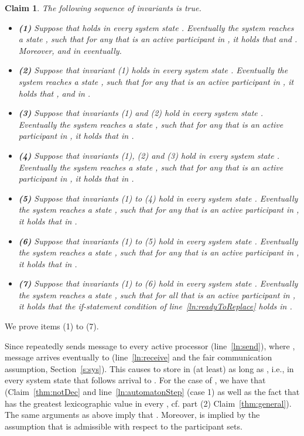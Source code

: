\documentclass[11pt]{article}
\newtheorem{claim}[theorem]{Claim}
\newenvironment{proof}{\noindent{\bf Proof.}}{\hfill}
\begin{document}
\begin{proof}
\begin{claim}
\label{thm:invar}
The following sequence of invariants is true.
\begin{itemize}[topsep=2pt,itemsep=-.5ex,partopsep=.5ex,parsep=1ex,leftmargin=2mm]
\item []{\bf (1)} Suppose that  holds in  every system state . Eventually the system reaches a state , such that for any  that is an active participant in , it holds that  and . Moreover, 
 and  in  eventually. 

\item[]{\bf (2)} Suppose that invariant (1) holds in  every system state . Eventually the system reaches a state , such that for any  that is an active participant in , it holds that ,  and   in .

\item[]{\bf (3)} Suppose that invariants (1) and (2) hold in every system state . Eventually the system reaches a state , such that for any  that is an active participant in , it holds that   in .

\item[]{\bf (4)} Suppose that invariants (1), (2) and (3) hold in every system state . Eventually the system reaches a state , such that for any  that is an active participant in , it holds that   in . 

\item[]{\bf (5)} Suppose that invariants (1) to (4) hold in every system state . Eventually the system reaches a state , such that for any  that is an active participant in , it holds that  in . 

\item[]{\bf (6)} Suppose that invariants (1) to (5) hold in every system state . Eventually the system reaches a state , such that for any  that is an active participant in , it holds that   in . 






\item[]{\bf (7)} Suppose that invariants (1) to (6) hold in every system state . Eventually the system reaches a state , such that for all  that is an active participant in , it holds that the if-statement condition of line~\ref{ln:readyToReplace} holds in .
\end{itemize}
\end{claim}
\begin{proof} We prove items (1) to (7). 
	
 Since  repeatedly sends message  to every active processor  (line~\ref{ln:send}), where , message  arrives eventually to  (line~\ref{ln:receive} and the fair communication assumption, Section~\ref{s:sys}). This causes  to store  in  (at least) as long as , i.e., in every system state  that follows  arrival to . For the case of , we have that  (Claim~\ref{thm:notDec} and line~\ref{ln:automatonStep} (case 1) as well as the fact that  has the greatest lexicographic value in every , cf. part (2) Claim~\ref{thm:general}).
The same arguments as above imply that . Moreover,  is implied by the assumption that  is admissible with respect to the participant sets.


\end{proof}
\end{proof}
\end{document}

